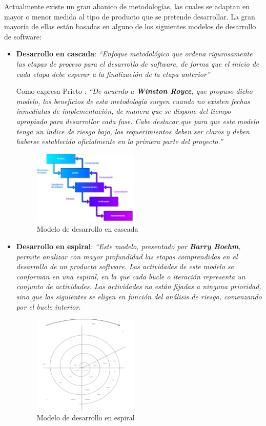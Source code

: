 Actualmente existe un gran abanico de metodologías, las cuales se adaptan en mayor o menor medida al tipo de producto 
que se pretende desarrollar. La gran mayoría de ellas están basadas en alguno de los siguientes modelos de desarrollo 
de software:
\begin{itemize}
    \item \textbf{Desarrollo en cascada}: \textit{“Enfoque metodológico que ordena rigurosamente las etapas de proceso para el 
    desarrollo de software, de forma que el inicio de cada etapa debe esperar a la finalización de la etapa anterior”} \autocite*{Pressman1988}
    
    Como expresa Prieto \autocite*{PrietoAlvarez2013}: \textit{“De acuerdo a \textbf{Winston Royce}, que propuso dicho modelo, los beneficios de esta metodología surgen cuando no existen 
    fechas inmediatas de implementación, de manera que se dispone del tiempo apropiado para desarrollar cada fase.
    Cabe destacar que para que este modelo tenga un índice de riesgo bajo, los requerimientos deben ser claros y deben 
    haberse establecido oficialmente en la primera parte del proyecto.”} \medskip
    \begin{figure}[H]
        \centering
        \includegraphics[width=5cm]{Figures/modelo_cascada.jpg}
        \caption{Modelo de desarrollo en cascada}
    \end{figure}

    \item \textbf{Desarrollo en espiral}: \textit{“Este modelo, presentado por \textbf{Barry Boehm}, permite analizar con mayor profundidad 
    las etapas comprendidas en el desarrollo de un producto software. Las actividades de este modelo se conforman en una espiral, 
    en la que cada bucle o iteración representa un conjunto de actividades. Las actividades no están fijadas a ninguna prioridad, 
    sino que las siguientes se eligen en función del análisis de riesgo, comenzando por el bucle interior.} \autocite*{PrietoAlvarez2013} \medskip 


    \begin{figure}[H]
        \centering
        \includegraphics[width=5cm]{Figures/SVG/espiral.png}
        \caption{Modelo de desarrollo en espiral}
    \end{figure}


\end{itemize}
